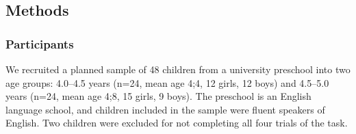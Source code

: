 \documentclass[man]{apa2}
\begin{document}











\subsection{Methods}

\subsubsection{Participants}

We recruited a planned sample of 48 children from a university preschool into two age groups: 4.0--4.5 years (n=24, mean age 4;4, 12 girls, 12 boys) and 4.5--5.0 years (n=24, mean age 4;8, 15 girls, 9 boys). The preschool is an English language school, and children included in the sample were fluent speakers of English. Two children were excluded for not completing all four trials of the task.
\end{document}
